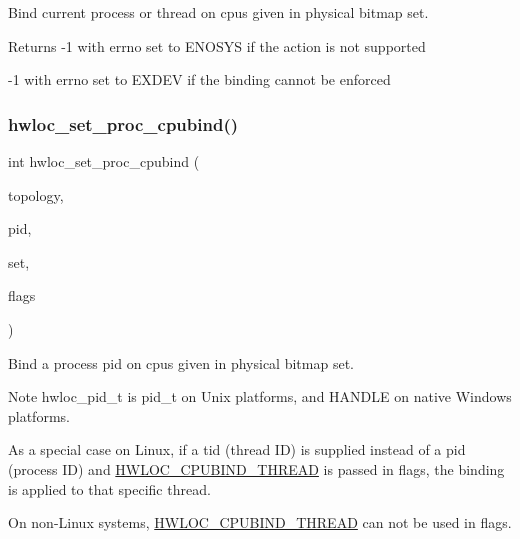 Bind current process or thread on cpus given in physical bitmap {\ttfamily set}. 

\begin{DoxyReturn}{Returns}
-\/1 with errno set to E\+N\+O\+S\+YS if the action is not supported 

-\/1 with errno set to E\+X\+D\+EV if the binding cannot be enforced 
\end{DoxyReturn}
\mbox{\label{a00190_ga296db8a3c6d49b51fb83d6f3e45c02a6}} 
\subsubsection{\texorpdfstring{hwloc\+\_\+set\+\_\+proc\+\_\+cpubind()}{hwloc\_set\_proc\_cpubind()}}
{\footnotesize\ttfamily int hwloc\+\_\+set\+\_\+proc\+\_\+cpubind (\begin{DoxyParamCaption}\item[{\hyperlink{a00186_ga9d1e76ee15a7dee158b786c30b6a6e38}{hwloc\+\_\+topology\+\_\+t}}]{topology,  }\item[{hwloc\+\_\+pid\+\_\+t}]{pid,  }\item[{\hyperlink{a00183_ga1f784433e9b606261f62d1134f6a3b25}{hwloc\+\_\+const\+\_\+cpuset\+\_\+t}}]{set,  }\item[{int}]{flags }\end{DoxyParamCaption})}



Bind a process {\ttfamily pid} on cpus given in physical bitmap {\ttfamily set}. 

\begin{DoxyNote}{Note}
{\ttfamily hwloc\+\_\+pid\+\_\+t} is {\ttfamily pid\+\_\+t} on Unix platforms, and {\ttfamily H\+A\+N\+D\+LE} on native Windows platforms.

As a special case on Linux, if a tid (thread ID) is supplied instead of a pid (process ID) and \hyperlink{a00190_gga217dc8d373f8958cc93c154ebce1c71caf1b6bbad00d7b1017b918e3719f4d421}{H\+W\+L\+O\+C\+\_\+\+C\+P\+U\+B\+I\+N\+D\+\_\+\+T\+H\+R\+E\+AD} is passed in flags, the binding is applied to that specific thread.

On non-\/\+Linux systems, \hyperlink{a00190_gga217dc8d373f8958cc93c154ebce1c71caf1b6bbad00d7b1017b918e3719f4d421}{H\+W\+L\+O\+C\+\_\+\+C\+P\+U\+B\+I\+N\+D\+\_\+\+T\+H\+R\+E\+AD} can not be used in {\ttfamily flags}. 
\end{DoxyNote}
\mbox{\label{a00190_gae42c01b2addcfbf6048b9a516dd7a906}} 
